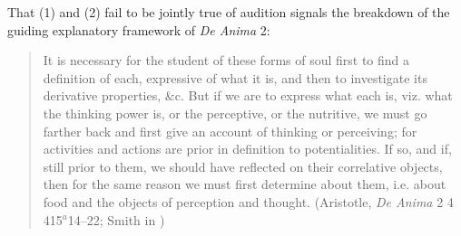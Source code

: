 That (1) and (2) fail to be jointly true of audition signals the breakdown of the guiding explanatory framework of \emph{De Anima} 2:
\begin{quote}
	It is necessary for the student of these forms of soul first to find a definition of each, expressive of what it is, and then to investigate its derivative properties, \&c. But if we are to express what each is, viz. what the thinking power is, or the perceptive, or the nutritive, we must go farther back and first give an account of thinking or perceiving; for activities and actions are prior in definition to potentialities. If so, and if, still prior to them, we should have reflected on their correlative objects, then for the same reason we must first determine about them, i.e. about food and the objects of perception and thought. (Aristotle, \emph{De Anima} 2 4 415\( ^{a} \)14--22; Smith in \citealt[26]{Barnes:1984uq})
\end{quote}
